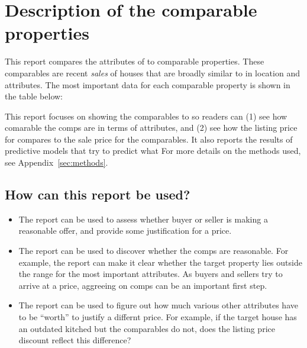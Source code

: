 \documentclass[
12pt, %
letterpaper, %
oneside, %
headinclude,footinclude, %
BCOR5mm, %
]{scrartcl}
\begin{document}


\section{Description of the comparable properties}
This report compares the attributes of \PropertyName{} to \NumberOfComps{} comparable properties.
These comparables are recent \emph{sales} of houses that are broadly similar to \PropertyName{} in location and attributes. 
The most important data for each comparable property is shown in the table below:



This report focuses on showing the comparables to \PropertyName{} so readers can (1) see how comarable the comps are in terms of attributes, and (2) see how the listing price for \PropertyName{} compares to the sale price for the comparables.   
It also reports the results of predictive models that try to predict what
For more details on the methods used, see Appendix~\ref{sec:methods}.

\subsection{How can this report be used?}
\begin{itemize}
\item The report can be used to assess whether buyer or seller is making a reasonable offer, and provide some justification for a price. 
\item The report can be used to discover whether the comps are reasonable. For example, the report can make it clear whether the target property lies outside the range for the most important attributes. As buyers and sellers try to arrive at a price, aggreeing on comps can be an important first step. 
\item The report can be used to figure out how much various other attributes have to be ``worth'' to justify a differnt price. For example, if the target house has an outdated kitched but the comparables do not, does the listing price discount reflect this difference? 
\end{itemize} 
\end{document}
